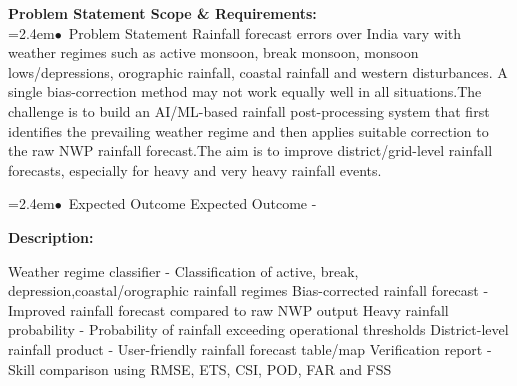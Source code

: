 \documentclass[10pt,a4paper]{article}
\begin{document}
\begin{tcolorbox}[pscard, title={"\textbf{SIH26080} \quad $\vert$ \quad Regime-Aware AI Post-Processing of Monsoon Rainfall Forecasts}]
\textbf{\color{sihnavy}Problem Statement Scope \& Requirements:}\\[0.15cm]
\noindent\hspace*{1.2em}\hangindent=2.4em\textcolor{sihblue}{$\bullet$}~\small Problem Statement Rainfall forecast errors over India vary with weather regimes such as active monsoon, break monsoon, monsoon lows/depressions, orographic rainfall, coastal rainfall and western disturbances. A single bias-correction method may not work equally well in all situations.The challenge is to build an AI/ML-based rainfall post-processing system that first identifies the prevailing weather regime and then applies suitable correction to the raw NWP rainfall forecast.The aim is to improve district/grid-level rainfall forecasts, especially for heavy and very heavy rainfall events.\par\vspace{0.05cm}
\noindent\hspace*{1.2em}\hangindent=2.4em\textcolor{sihblue}{$\bullet$}~\small Expected Outcome Expected Outcome -\par\vspace{0.05cm}
\vspace{0.18cm}\noindent\textbf{\color{sihnavy}Description:}\par\vspace{0.06cm}
\noindent\small Weather regime classifier - Classification of active, break, depression,coastal/orographic rainfall regimes Bias-corrected rainfall forecast - Improved rainfall forecast compared to raw NWP output Heavy rainfall probability - Probability of rainfall exceeding operational thresholds District-level rainfall product - User-friendly rainfall forecast table/map Verification report - Skill comparison using RMSE, ETS, CSI, POD, FAR and FSS\par\vspace{0.06cm}

\end{tcolorbox}
\vspace{0.4cm}
{}
\end{document}
